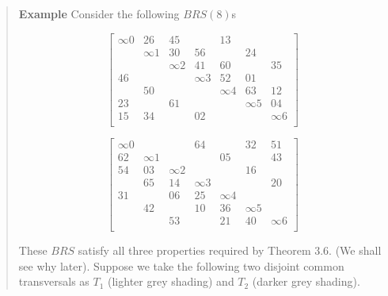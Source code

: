 \documentclass[
  11pt,
  a4paper]{book}
\newcounter{examplecounter}
\begin{document}
\begin{quote}  \textbf{Example } \quad 
Consider the following $BRS(8)$s

\begin{equation}
  \begin{bmatrix}
    \infty 0 &    26    &    45    &            &    13    &            &          \\
             & \infty 1 &    30    &     56     &          &     24     &          \\
             &          & \infty 2 &     41     &    60    &            &    35    \\
      46     &          &          &  \infty 3  &    52    &     01     &          \\
             &    50    &          &            & \infty 4 &     63     &    12    \\
      23     &          &    61    &            &          &  \infty 5  &    04    \\
      15     &    34    &          &     02     &          &            & \infty 6 \\
  \end{bmatrix}
\end{equation}

\begin{equation}
  \begin{bmatrix}
    \infty 0 &          &          &     64     &          &     32     &    51    \\
      62     & \infty 1 &          &            &    05    &            &    43    \\
      54     &    03    & \infty 2 &            &          &     16     &          \\
             &    65    &    14    &  \infty 3  &          &            &    20    \\
      31     &          &    06    &     25     & \infty 4 &            &          \\
             &    42    &          &     10     &    36    &  \infty 5  &          \\
             &          &    53    &            &    21    &     40     & \infty 6 \\
  \end{bmatrix}
\end{equation}

These $BRS$ satisfy all three properties required by Theorem 3.6. (We
shall see why later).
Suppose we take the following two disjoint common transversals as $T_1$
(lighter grey shading) and $T_2$ (darker grey shading).


\end{quote}
\end{document}
